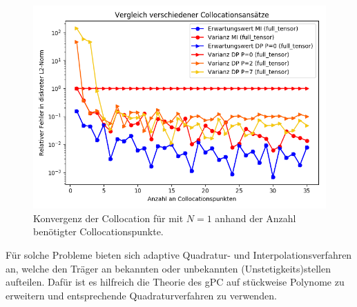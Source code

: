 \begin{figure}[!htb]
\includegraphics[width=\textwidth]{Figures/collocation_midp_trialdisconttriple.png}
\caption{Konvergenz der Collocation für  mit $N=1$ anhand der Anzahl benötigter Collocationspunkte.}
\label{fig:collocation_comparison_trialdisconttriple}
\end{figure}
Für solche Probleme bieten sich adaptive Quadratur- und Interpolationsverfahren an, welche den Träger an bekannten oder unbekannten (Unstetigkeits)stellen aufteilen. Dafür ist es hilfreich die Theorie des gPC auf stückweise Polynome zu erweitern und entsprechende Quadraturverfahren zu verwenden.

